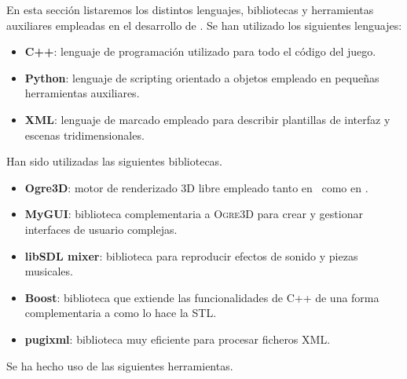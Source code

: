 \documentclass[a4paper,11pt]{article}
\begin{document}
\noindent En esta sección listaremos los distintos lenguajes, bibliotecas
y herramientas auxiliares empleadas en el desarrollo de \juego. Se han
utilizado los siguientes lenguajes:

\begin{itemize}
    \item \textbf{C++}: lenguaje de programación utilizado para todo el
    código del juego.
    \item \textbf{Python}: lenguaje de scripting orientado a objetos empleado
    en pequeñas herramientas auxiliares.
    \item \textbf{XML}: lenguaje de marcado empleado para describir plantillas
    de interfaz y escenas tridimensionales.\\
\end{itemize}

Han sido utilizadas las siguientes bibliotecas.

\begin{itemize}
    \item \textbf{Ogre3D}: motor de renderizado 3D libre empleado tanto
    en \wiki\ como en \juego.
    \item \textbf{MyGUI}: biblioteca complementaria a \textsc{Ogre3D} para
    crear y gestionar interfaces de usuario complejas.
    \item \textbf{libSDL mixer}: biblioteca para reproducir efectos de sonido
    y piezas musicales.
    \item \textbf{Boost}: biblioteca que extiende las funcionalidades de C++
    de una forma complementaria a como lo hace la \textsc{STL}.
    \item \textbf{pugixml}: biblioteca muy eficiente para procesar ficheros
    XML.\\
\end{itemize}

Se ha hecho uso de las siguientes herramientas.
\end{document}
